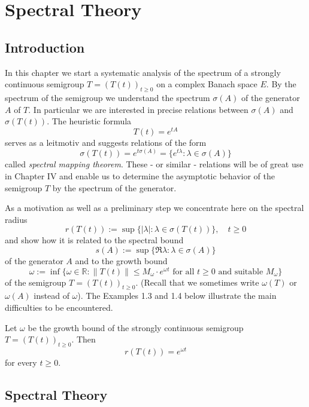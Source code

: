 
\author{Günther Greiner and Rainer Nagel}
\chapter{Spectral Theory}\label{chap:A-III}
\section{Introduction}

In this chapter we start a systematic analysis of the spectrum of a strongly continuous semigroup $T = (T(t))_{t\geq 0}$ on a complex Banach space $E$.
By the spectrum of the semigroup we understand the spectrum $\sigma(A)$ of the generator $A$ of $T$.
In particular we are interested in precise relations between $\sigma(A)$ and $\sigma(T(t))$.
The heuristic formula
\[
	T(t) = e^{tA}
\]
serves as a leitmotiv and suggests relations of the form
\[
\sigma(T(t)) = e^{t\sigma(A)} = \{ e^{t\lambda} : \lambda \in \sigma(A) \}
\]
called \emph{spectral mapping theorem}.
These - or similar - relations will be of great use in Chapter IV and enable us to determine the asymptotic behavior of the semigroup $T$ by the spectrum of the generator.

As a motivation as well as a preliminary step we concentrate here on the spectral radius
\[
r(T(t)) := \sup \{ |\lambda| : \lambda \in \sigma(T(t)) \}, \quad t \geq 0
\]
and show how it is related to the spectral bound
\[
s(A) := \sup \{ \Re\lambda : \lambda \in \sigma(A) \}
\]
of the generator $A$ and to the growth bound
\[
\omega := \inf \{\omega \in \mathbb{R} : \|T(t)\| \leq M_{\omega}\cdot e^{\omega t} \text{ for all } t \geq 0 \text{ and suitable } M_{\omega}\}
\]
of the semigroup $T = (T(t))_{t\geq 0}$.
(Recall that we sometimes write $\omega(T)$ or $\omega(A)$ instead of $\omega$).
The Examples 1.3 and 1.4 below illustrate the main difficulties to be encountered.

\begin{proposition}\label{prop:1.1}
Let $\omega$ be the growth bound of the strongly continuous semigroup $T = (T(t))_{t\geq 0}$.
Then
\[
r(T(t)) = e^{\omega t}
\]
for every $t \geq 0$.
\end{proposition}

\newpage

\section{Spectral Theory}\label{sec:a3-1}


